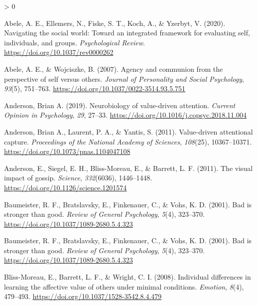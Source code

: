 \documentclass[
  english,
  man]{apa6}
\newlength{\cslhangindent}
\newenvironment{CSLReferences}[2] %
 {%
  \setlength{\parindent}{0pt}
  \ifodd #1 \everypar{\setlength{\hangindent}{\cslhangindent}}\ignorespaces\fi
  \ifnum #2 > 0
  \setlength{\parskip}{#2\baselineskip}
  \fi
 }%
 {}
\begin{document}
\begingroup
\setlength{\parindent}{-0.5in}
\setlength{\leftskip}{0.5in}

\hypertarget{refs}{}
\begin{CSLReferences}{1}{0}
\leavevmode\hypertarget{ref-abele_navigating_2020}{}%
Abele, A. E., Ellemers, N., Fiske, S. T., Koch, A., \& Yzerbyt, V. (2020). Navigating the social world: Toward an integrated framework for evaluating self, individuals, and groups. \emph{Psychological Review}. \url{https://doi.org/10.1037/rev0000262}

\leavevmode\hypertarget{ref-abele_agency_2007}{}%
Abele, A. E., \& Wojciszke, B. (2007). Agency and communion from the perspective of self versus others. \emph{Journal of Personality and Social Psychology}, \emph{93}(5), 751--763. \url{https://doi.org/10.1037/0022-3514.93.5.751}

\leavevmode\hypertarget{ref-anderson_neurobiology_2019}{}%
Anderson, Brian A. (2019). Neurobiology of value-driven attention. \emph{Current Opinion in Psychology}, \emph{29}, 27--33. \url{https://doi.org/10.1016/j.copsyc.2018.11.004}

\leavevmode\hypertarget{ref-anderson_value-driven_2011}{}%
Anderson, Brian A., Laurent, P. A., \& Yantis, S. (2011). Value-driven attentional capture. \emph{Proceedings of the National Academy of Sciences}, \emph{108}(25), 10367--10371. \url{https://doi.org/10.1073/pnas.1104047108}

\leavevmode\hypertarget{ref-anderson_visual_2011}{}%
Anderson, E., Siegel, E. H., Bliss-Moreau, E., \& Barrett, L. F. (2011). The visual impact of gossip. \emph{Science}, \emph{332}(6036), 1446--1448. \url{https://doi.org/10.1126/science.1201574}

\leavevmode\hypertarget{ref-baumeister_bad_2001}{}%
Baumeister, R. F., Bratslavsky, E., Finkenauer, C., \& Vohs, K. D. (2001). Bad is stronger than good. \emph{Review of General Psychology}, \emph{5}(4), 323--370. \url{https://doi.org/10.1037/1089-2680.5.4.323}

\leavevmode\hypertarget{ref-baumeister_bad_2001}{}%
Baumeister, R. F., Bratslavsky, E., Finkenauer, C., \& Vohs, K. D. (2001). Bad is stronger than good. \emph{Review of General Psychology}, \emph{5}(4), 323--370. \url{https://doi.org/10.1037/1089-2680.5.4.323}

\leavevmode\hypertarget{ref-bliss-moreau_individual_2008}{}%
Bliss-Moreau, E., Barrett, L. F., \& Wright, C. I. (2008). Individual differences in learning the affective value of others under minimal conditions. \emph{Emotion}, \emph{8}(4), 479--493. \url{https://doi.org/10.1037/1528-3542.8.4.479}


\end{CSLReferences}
\end{document}
